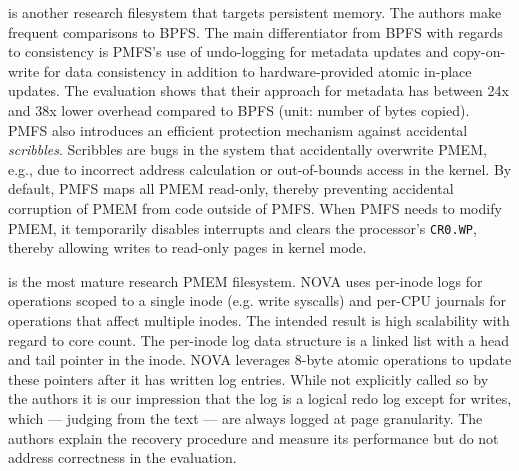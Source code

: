 \documentclass[12pt,a4paper,twoside]{book}
\begin{document}
 is another research filesystem that targets persistent memory.
The authors make frequent comparisons to BPFS.
The main differentiator from BPFS with regards to consistency is PMFS’s use of undo-logging for metadata updates and copy-on-write for data consistency in addition to hardware-provided atomic in-place updates.
The evaluation shows that their approach for metadata has between 24x and 38x lower overhead compared to BPFS (unit: number of bytes copied).
PMFS also introduces an efficient protection mechanism against accidental \textit{scribbles}.
Scribbles are bugs in the system that accidentally overwrite PMEM, e.g., due to incorrect address calculation or out-of-bounds access in the kernel.
By default, PMFS maps all PMEM read-only, thereby preventing accidental corruption of PMEM from code outside of PMFS.
When PMFS needs to modify PMEM, it temporarily disables interrupts and clears the processor's \lstinline{CR0.WP}, thereby allowing writes to read-only pages in kernel mode.~\cite{dulloorSystemSoftwarePersistent2014,intelSdmCr0WpFlag}

 is the most mature research PMEM filesystem.
NOVA uses per-inode logs for operations scoped to a single inode (e.g. write syscalls) and per-CPU journals for operations that affect multiple inodes.
The intended result is high scalability with regard to core count.
The per-inode log data structure is a linked list with a head and tail pointer in the inode.
NOVA leverages 8-byte atomic operations to update these pointers after it has written log entries.
While not explicitly called so by the authors it is our impression that the log is a logical redo log except for writes, which --- judging from the text --- are always logged at page granularity.
The authors explain the recovery procedure and measure its performance but do not address correctness in the evaluation.
\end{document}
